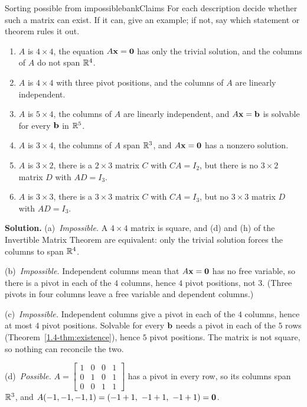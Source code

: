 \documentclass[11pt]{article}
\begin{document}
\begin{exmp}{Sorting possible from impossible}{bankClaims}
For each description decide whether such a matrix can exist. If it can, give an example; if not, say which statement or theorem rules it out.
\begin{enumerate}[label=(\alph*),itemsep=2pt]
  \item $A$ is $4\times4$, the equation $A\mathbf{x}=\mathbf{0}$ has only the trivial solution, and the columns of $A$ do not span $\mathbb{R}^4$.
  \item $A$ is $4\times4$ with three pivot positions, and the columns of $A$ are linearly independent.
  \item $A$ is $5\times4$, the columns of $A$ are linearly independent, and $A\mathbf{x}=\mathbf{b}$ is solvable for every $\mathbf{b}$ in $\mathbb{R}^5$.
  \item $A$ is $3\times4$, the columns of $A$ span $\mathbb{R}^3$, and $A\mathbf{x}=\mathbf{0}$ has a nonzero solution.
  \item $A$ is $3\times2$, there is a $2\times3$ matrix $C$ with $CA=I_2$, but there is no $3\times2$ matrix $D$ with $AD=I_3$.
  \item $A$ is $3\times3$, there is a $3\times3$ matrix $C$ with $CA=I_3$, but no $3\times3$ matrix $D$ with $AD=I_3$.
\end{enumerate}

\textbf{Solution.} (a)~\emph{Impossible.} A $4\times4$ matrix is square, and (d) and (h) of the Invertible Matrix Theorem are equivalent: only the trivial solution forces the columns to span $\mathbb{R}^4$.

(b)~\emph{Impossible.} Independent columns mean that $A\mathbf{x}=\mathbf{0}$ has no free variable, so there is a pivot in each of the $4$ columns, hence $4$ pivot positions, not $3$. (Three pivots in four columns leave a free variable and dependent columns.)

(c)~\emph{Impossible.} Independent columns give a pivot in each of the $4$ columns, hence at most $4$ pivot positions. Solvable for every $\mathbf{b}$ needs a pivot in each of the $5$ rows (Theorem~\ref{1.4-thm:existence}), hence $5$ pivot positions. The matrix is not square, so nothing can reconcile the two.

(d)~\emph{Possible.} $A=\begin{bmatrix}1&0&0&1\\0&1&0&1\\0&0&1&1\end{bmatrix}$ has a pivot in every row, so its columns span $\mathbb{R}^3$, and $A(-1,-1,-1,1)=(-1+1,\ -1+1,\ -1+1)=\bv{0}$.


\end{exmp}
\end{document}

